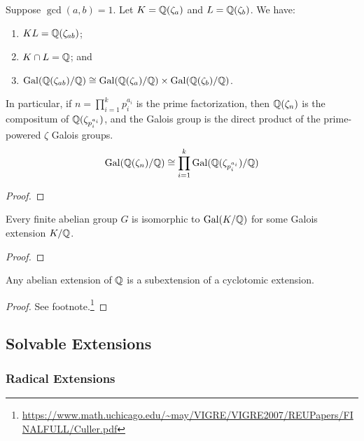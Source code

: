 \begin{proposition}
    Suppose \(\gcd(a,b) = 1\).
    Let \(K = \mathbb{Q}(\zeta_a)\) and \(L = \mathbb{Q}(\zeta_b)\).
    We have:
    \begin{enumerate}[label={(\alph*)}, itemsep=0mm]
        \item \(KL = \mathbb{Q}(\zeta_{ab})\);
        \item \(K \cap L = \mathbb{Q}\); and
        \item \(\operatorname{Gal}(\mathbb{Q}(\zeta_{ab})/\mathbb{Q}) \cong \operatorname{Gal}(\mathbb{Q}(\zeta_a)/\mathbb{Q}) \times \operatorname{Gal}(\mathbb{Q}(\zeta_b)/\mathbb{Q})\).
    \end{enumerate}
    In particular, if \(n = \prod_{i=1}^k p_i^{a_i}\) is the prime factorization,
    then \(\mathbb{Q}(\zeta_n)\) is the compositum of \(\mathbb{Q}(\zeta_{p_i^{a_i}})\),
    and the Galois group is the direct product of the prime-powered \(\zeta\) Galois groups.
    \begin{equation*}
        \operatorname{Gal}(\mathbb{Q}(\zeta_n)/\mathbb{Q}) \cong \prod_{i=1}^k \operatorname{Gal}(\mathbb{Q}(\zeta_{p_i^{a_i}})/\mathbb{Q})
    \end{equation*}
\end{proposition}
\begin{proof}
\end{proof}

\begin{theorem}
    Every finite abelian group \(G\) is isomorphic to \(\operatorname{Gal}(K/\mathbb{Q})\)
    for some Galois extension \(K/\mathbb{Q}\).
\end{theorem}
\begin{proof}
\end{proof}

\begin{theorem}
    Any abelian extension of \(\mathbb{Q}\)
    is a subextension of a cyclotomic extension.
\end{theorem}
\begin{proof}
    See footnote.\footnote{%
        \url{https://www.math.uchicago.edu/~may/VIGRE/VIGRE2007/REUPapers/FINALFULL/Culler.pdf}
    }
\end{proof}


\subsection{Solvable Extensions}

\subsubsection*{Radical Extensions}

